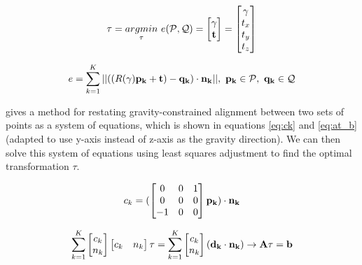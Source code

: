 \begin{equation}
    \label{eq:tau}
    \tau = \underset{\tau}{argmin} \ e (\mathcal{P},\mathcal{Q}) = \begin{bmatrix}
        \gamma \\
        \bf{t}
    \end{bmatrix} = \begin{bmatrix}
        \gamma \\
        t_x    \\
        t_y    \\
        t_z
    \end{bmatrix}
\end{equation}

\begin{equation}
    \label{eq:point2plane}
    e = \sum_{k=1}^{K} || ((R(\gamma)\bf{p_k} + \bf{t}) - \bf{q_k})  \cdot \bf{n_k}||,\ \bf{p_k} \in \mathcal{P},\ \bf{q_k} \in \mathcal{Q}
\end{equation}

\cite{kubelka_gravity-constrained_2022} gives a method for restating gravity-constrained alignment between two sets of points as a system of equations, which is shown in equations \ref{eq:ck} and \ref{eq:at_b} (adapted to use y-axis instead of z-axis as the gravity direction). We can then solve this system of equations using least squares adjustment to find the optimal transformation \(\tau\).

\begin{equation}
    \label{eq:ck}
    c_k = (\begin{bmatrix}
        0  & 0 & 1 \\
        0  & 0 & 0 \\
        -1 & 0 & 0 \\
    \end{bmatrix} \bf{p_k}) \cdot \bf{n_k}
\end{equation}

\begin{equation}
    \label{eq:at_b}
    \sum_{k=1}^{K} \begin{bmatrix}
        c_k \\
        n_k
    \end{bmatrix}
    \begin{bmatrix}
        c_k & n_k
    \end{bmatrix}
    \tau = \sum_{k=1}^{K} \begin{bmatrix}
        c_k \\
        n_k
    \end{bmatrix} (\bf{d_k} \cdot \bf{n_k}) \rightarrow A \tau = \bf{b}
\end{equation}

